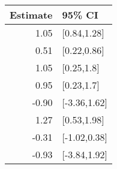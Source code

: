 \begin{tabular}{rl}
  \hline
Estimate & 95\% CI \\ 
  \hline
1.05 & [0.84,1.28] \\ 
  0.51 & [0.22,0.86] \\ 
  1.05 & [0.25,1.8] \\ 
  0.95 & [0.23,1.7] \\ 
  -0.90 & [-3.36,1.62] \\ 
  1.27 & [0.53,1.98] \\ 
  -0.31 & [-1.02,0.38] \\ 
  -0.93 & [-3.84,1.92] \\ 
   \hline
\end{tabular}

